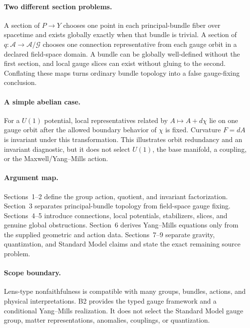 \documentclass[11pt]{article}
\newcommand{\Conn}{\mathcal A}
\newcommand{\Gg}{\mathcal G}
\begin{document}
\paragraph{Two different section problems.}
A section of $P\to Y$ chooses one point in each principal-bundle fiber over
spacetime and exists globally exactly when that bundle is trivial.  A section
of $q:\Conn\to\Conn/\Gg$ chooses one connection representative from each
gauge orbit in a declared field-space domain.  A bundle can be globally
well-defined without the first section, and local gauge slices can exist
without gluing to the second.  Conflating these maps turns ordinary bundle
topology into a false gauge-fixing conclusion.

\paragraph{A simple abelian case.}
For a $U(1)$ potential, local representatives related by
$A\mapsto A+d\chi$ lie on one gauge orbit after the allowed boundary behavior
of $\chi$ is fixed.  Curvature $F=dA$ is invariant under this transformation.
This illustrates orbit redundancy and an invariant diagnostic, but it does
not select $U(1)$, the base manifold, a coupling, or the Maxwell/Yang--Mills
action.

\paragraph{Argument map.}
Sections~1--2 define the group action, quotient, and invariant
factorization.  Section~3 separates principal-bundle topology from
field-space gauge fixing.  Sections~4--5 introduce connections, local
potentials, stabilizers, slices, and genuine global obstructions.  Section~6
derives Yang--Mills equations only from the supplied geometric and action
data.  Sections~7--9 separate gravity, quantization, and Standard Model claims
and state the exact remaining source problem.

\paragraph{Scope boundary.}
Lens-type nonfaithfulness is compatible with many groups, bundles, actions,
and physical interpretations.  B2 provides the typed gauge framework and a
conditional Yang--Mills realization.  It does not select the Standard Model
gauge group, matter representations, anomalies, couplings, or quantization.

\tableofcontents
\newpage
\end{document}
